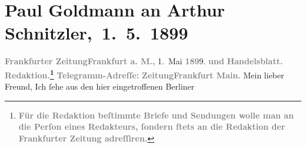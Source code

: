 

         
         \renewcommand{\erwaehntePersonen}{Personen: Marie Reinhard}
         \renewcommand{\erwaehnteInstitutionen}{Institutionen: Frankfurter Zeitung}
         \renewcommand{\erwaehnteOrte}{Orte: Berlin, Den Haag, Deutsches Theater Berlin, Frankfurt am Main, Graz, Wien}
         \renewcommand{\erwaehnteWerke}{Werke: Der grüne Kakadu – Paracelsus – Die Gefährtin. Drei Einakter, Der grüne Kakadu. Groteske in einem Akt}
               \section[ Paul Goldmann an Arthur Schnitzler, 1. 5. 1899]{ Paul Goldmann an Arthur Schnitzler, 1. 5. 1899}\nopagebreak{}\rehead{ }\begin{ledgroupsized}[t]{13cm}\normalsize\beginnumbering \toendnotes[C]{\smallbreak\pagebreak[2]} 
\toendnotes[C]{\smallbreak}\pstart
           \noindent{}{\pb}\textcolor{gray}{\textbf{\textbf{Frankfurter Zeitung}}}\hfill \textcolor{gray}{\textbf{\textbf{Frankfurt a.
                        M.,}}}{ }1. Mai \textcolor{gray}{\textbf{189}}9.\pend
           \pstart
           \textcolor{gray}{\textbf{und}}\pend
           \pstart
           \textcolor{gray}{\textbf{Handelsblatt.}}\pend
           \pstart
           \textcolor{gray}{\textbf{\textbf{Redaktion.}\footnote{\noindent{}\textcolor{gray}{\textbf{Für die Redaktion beſtimmte Briefe und Sendungen wolle man
                                  an die Perſon eines Redakteurs,
                              ſondern ſtets \textbf{an die Redaktion der Frankfurter Zeitung} adreſſiren.}}}}}\pend
           \pstart
           \textcolor{gray}{\textbf{Telegramm-Adreſſe:}}\pend
           \pstart
           \textcolor{gray}{\textbf{\textbf{ZeitungFrankfurt Main.}}}\pend
           \pstart{}Mein lieber Freund,\pend\pstart
           Ich ſehe aus den hier eingetroffenen Berliner

\end{ledgroupsized}

